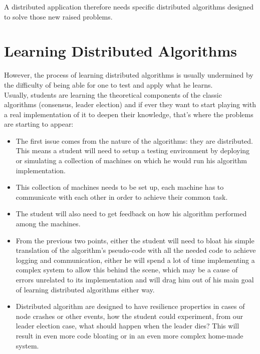 \documentclass{eplmastersthesis}
\begin{document}
    A distributed application therefore needs specific distributed algorithms
    designed to solve those new raised problems.

    \section{Learning Distributed Algorithms}

      However, the process of learning distributed algorithms
      is usually undermined by the difficulty of being able for one to test
      and apply what he learns.\\
      Usually, students are learning the theoretical components of the
      classic algorithms (consensus, leader election) and if ever they want
      to start playing with a real implementation of it to deepen their
      knowledge, that's where the problems are starting to appear:

      \begin{itemize}
        \item The first issue comes from the nature of the algorithms: they are
        distributed. This means a student will need to setup a testing
        environment by deploying or simulating a collection of machines on
        which he would run his algorithm implementation.
        \item This collection of machines needs to be set up, each machine has
        to communicate with each other in order to achieve their common task.
        \item The student will also need to get feedback on how his
        algorithm performed among the machines.
        \item From the previous two points, either the student will need to
        bloat his simple translation of the algorithm's pseudo-code
        with all the needed code to achieve logging and communication, either
        he will spend a lot of time implementing a complex system to allow
        this behind the scene, which may be a cause of errors unrelated to its
        implementation and will drag him out of his main goal of learning
        distributed algorithms either way.
        \item Distributed algorithm are designed to have resilience
        properties in cases of node crashes or other events, how the student
        could experiment, from our leader election case, what should
        happen when the leader dies? This will result in even more code
        bloating or in an even more complex home-made system.
      \end{itemize}
\end{document}
